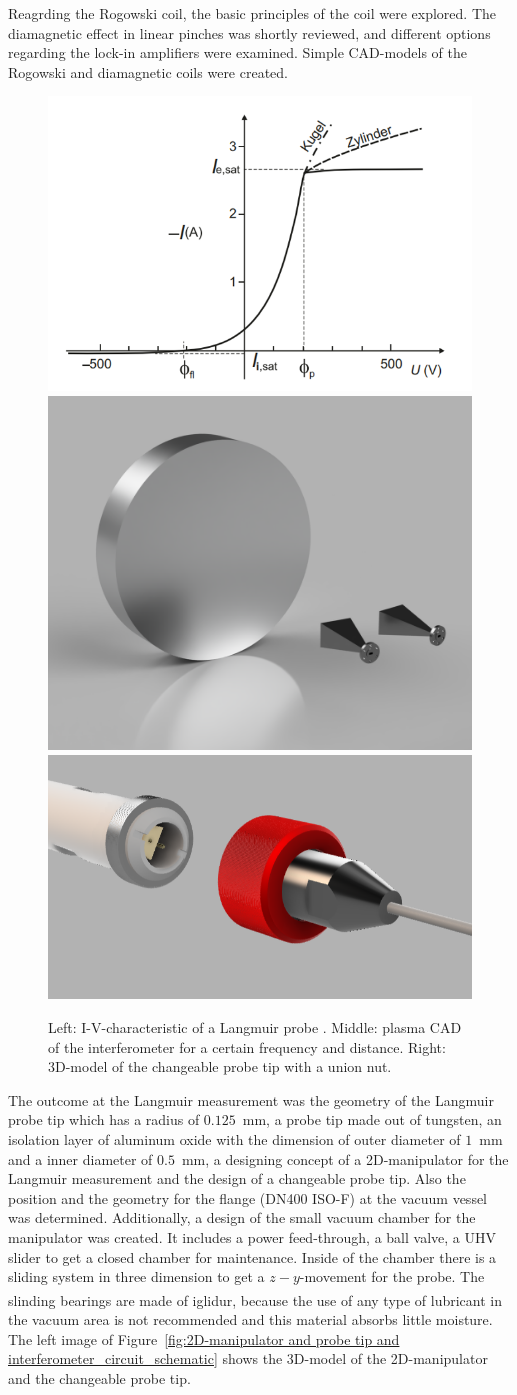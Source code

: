 Reagrding the Rogowski coil, the basic principles of the coil were explored. The
diamagnetic effect in linear pinches was shortly reviewed, and different options regarding the lock-in amplifiers were examined.
Simple CAD-models of the Rogowski and diamagnetic coils were created.

\begin{figure}[h]
    \centering
    \includegraphics[width=0.3\linewidth]{Images/04_Diagnostics/probe characteristic.png}
    \includegraphics[width=0.3\linewidth]{Images/04_Diagnostics/CAD_Interferometer.png}
    \includegraphics[width=0.3\linewidth]{Images/04_Diagnostics/CAD_changeable_probe_tip.png}
    \caption{Left: I-V-characteristic of a Langmuir probe \cite{Stroth_Plasmaphysik}. Middle: plasma CAD of the interferometer for a certain frequency and distance. Right: 3D-model of the changeable probe tip with a union nut.}
    \label{fig:probe characteristics and CAD_Interferometer and CAD_changeable_probe_tip}
\end{figure}


The outcome at the Langmuir measurement was the geometry of the Langmuir probe tip which has a radius of $0.125$~mm, a probe tip made out of tungsten, an isolation layer of aluminum oxide with the dimension of outer diameter of $1$~mm and a inner diameter of $0.5$~mm, a designing concept of a  2D-manipulator for the Langmuir measurement and the design of a changeable probe tip. Also the position and the geometry for the flange (DN400 ISO-F) at the vacuum vessel was determined. Additionally, a design of the small vacuum chamber for the manipulator was created. It includes a power feed-through, a ball valve, a UHV slider to get a closed chamber for maintenance. Inside of the chamber there is a sliding system in three dimension to get a $z-y$-movement for the probe. The slinding bearings are made of iglidur\textsuperscript{\tiny\textregistered}, because the use of any type of lubricant in the vacuum area is not recommended and this material absorbs little moisture. The left image of Figure~\ref{fig:2D-manipulator and probe tip and interferometer_circuit_schematic} shows the 3D-model of the 2D-manipulator and the changeable probe tip.




